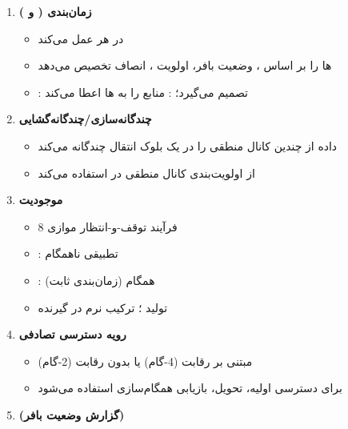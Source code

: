 
\begin{enumerate}
\def\labelenumi{\arabic{enumi}.}
\tightlist
\item
  \textbf{زمان‌بندی ( و )}

  \begin{itemize}
  \tightlist
  \item
    در هر  عمل می‌کند
  \item
    ها را بر اساس ، وضعیت بافر، اولویت ، انصاف تخصیص می‌دهد
  \item
    :  تصمیم می‌گیرد؛ :  منابع را به ها اعطا می‌کند
  \end{itemize}
\item
  \textbf{چندگانه‌سازی/\allowbreak{}چندگانه‌گشایی}

  \begin{itemize}
  \tightlist
  \item
    داده از چندین کانال منطقی را در یک بلوک انتقال چندگانه می‌کند
  \item
    از اولویت‌بندی کانال منطقی  در  استفاده می‌کند
  \end{itemize}
\item
  \textbf{موجودیت }

  \begin{itemize}
  \tightlist
  \item
    8 فرآیند توقف-و-انتظار موازی
  \item
    :  تطبیقی ناهمگام
  \item
    :  همگام (زمان‌بندی ثابت)
  \item
    تولید ؛ ترکیب نرم در گیرنده
  \end{itemize}
\item
  \textbf{رویه دسترسی تصادفی}

  \begin{itemize}
  \tightlist
  \item
    مبتنی بر رقابت (4-گام) یا بدون رقابت (2-گام)
  \item
    برای دسترسی اولیه، تحویل، بازیابی همگام‌سازی  استفاده می‌شود
  \end{itemize}
\item
  \textbf{ (گزارش وضعیت بافر)}


\end{enumerate}
